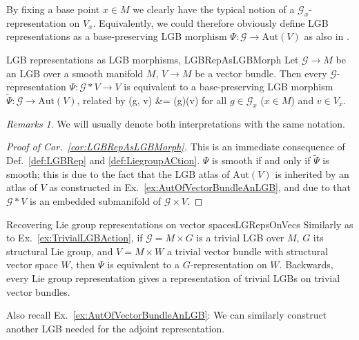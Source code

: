 \documentclass[a4paper,oneside,11pt,bibliography=totoc]{scrartcl}
\def\bas#1\eas{\begin{align*}#1\end{align*}}
\theoremstyle{plain}
\theoremstyle{remark}
\newtheorem{remark}[theorem]{Remarks}
\theoremstyle{definition}
\begin{document}
By fixing a base point $x \in M$ we clearly have the typical notion of a $\mathcal{G}_x$-representation on $V_x$. Equivalently, we could therefore obviously define LGB representations as a base-preserving LGB morphism $\Psi: \mathcal{G} \to \mathrm{Aut}(V)$ as also in \cite[\S 1.7, Def.\ 1.7.1, page 43]{mackenzieGeneralTheory}.

\begin{corollaries}{LGB representations as LGB morphisms, \newline \cite[\S 1.7, Prop.\ 1.7.2, page 43]{mackenzieGeneralTheory}}{LGBRepAsLGBMorph}
Let $\mathcal{G} \to M$ be an LGB over a smooth manifold $M$, $V \to M$ be a vector bundle. Then every $\mathcal{G}$-representation $\Psi: \mathcal{G} * V \to V$ is equivalent to a base-preserving LGB morphism $\widetilde{\Psi}: \mathcal{G} \to \mathrm{Aut}(V)$, related by
\bas
\Psi(g, v)
&=
\widetilde{\Psi}(g)(v)
\eas
for all $g \in \mathcal{G}_x$ ($x \in M$) and $v \in V_x$.
\end{corollaries}

\begin{remark}
\leavevmode\newline
We will usually denote both interpretations with the same notation.
\end{remark}

\begin{proof}[Proof of Cor.\ \ref{cor:LGBRepAsLGBMorph}]
\leavevmode\newline
This is an immediate consequence of Def.\ \ref{def:LGBRep} and \ref{def:LiegroupACtion}. $\Psi$ is smooth if and only if $\widetilde{\Psi}$ is smooth; this is due to the fact that the LGB atlas of $\mathrm{Aut}(V)$ is inherited by an atlas of $V$ as constructed in Ex.\ \ref{ex:AutOfVectorBundleAnLGB}, and due to that $\mathcal{G} * V$ is an embedded submanifold of $\mathcal{G} \times V$.
\end{proof}

\begin{examples}{Recovering Lie group representations on vector spaces}{LGRepsOnVecs}
Similarly as to Ex.\ \ref{ex:TrivialLGBAction}, if $\mathcal{G} = M \times G$ is a trivial LGB over $M$, $G$ its structural Lie group, and $V = M \times W$ a trivial vector bundle with structural vector space $W$, then $\Psi$ is equivalent to a $G$-representation on $W$. Backwards, every Lie group representation gives a representation of trivial LGBs on trivial vector bundles.
\end{examples}

Also recall Ex.\ \ref{ex:AutOfVectorBundleAnLGB}: We can similarly construct another LGB needed for the adjoint representation.
\end{document}
